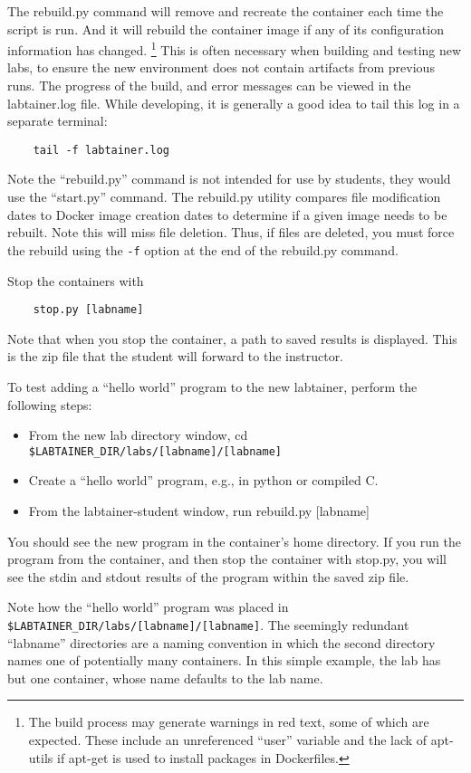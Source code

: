 \documentclass[12pt]{article}
\begin{document}
The rebuild.py command will remove and recreate the container
each time the script is run.  And it will rebuild the container image if any of its configuration 
information has changed.  \footnote{The build process may generate warnings in red text, some of which are expected.  
These include an unreferenced ``user'' variable and the lack of apt-utils if apt-get is used to install packages in 
Dockerfiles.}  This is often necessary when building and testing new labs, to ensure the
new environment does not contain artifacts from previous runs.
The progress of the build, and error messages can be viewed in 
the labtainer.log file.  While developing, it is generally a good idea to tail this log in
a separate terminal:
\begin{verbatim}
    tail -f labtainer.log
\end{verbatim}

Note the ``rebuild.py'' command is not intended for use by students, they would use the ``start.py'' command.  
The rebuild.py utility compares file modification dates to Docker image creation dates to determine if
a given image needs to be rebuilt.  Note this will miss file deletion.  Thus, if files are deleted, you must
force the rebuild using the {\tt -f} option at the end of the rebuild.py command.

Stop the containers with 
\begin{verbatim}
    stop.py [labname]
\end{verbatim}
Note that when you stop the container, a path to saved results is displayed.
This is the zip file that the student will forward to the instructor.

To test adding a ``hello world'' program to the new labtainer, perform the following steps:
\begin{itemize}
\item From the new lab directory window, cd \verb!$LABTAINER_DIR/labs/[labname]/[labname]!
\item Create a ``hello world'' program, e.g., in python or compiled C.
\item From the labtainer-student window, run rebuild.py [labname]
\end{itemize}
    
You should see the new program in the container's
home directory.  If you run the program from the container, and then stop the container
with stop.py, you will see the stdin and stdout results of the program within the
saved zip file.

Note how the ``hello world'' program was placed in \verb!$LABTAINER_DIR/labs/[labname]/[labname]!.
The seemingly redundant ``labname'' directories are a naming convention in which the
second directory names one of potentially many containers.  In this simple example,
the lab has but one container, whose name defaults to the lab name.
\end{document}
